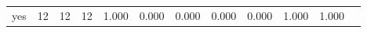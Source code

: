 \begin{longtable}{lp{1.00cm}p{1.00cm}p{1.00cm}p{1.00cm}p{1.00cm}p{1.00cm}p{1.00cm}p{1.00cm}p{1.00cm}p{1.00cm}p{1.00cm}}
yes       &                           12 &                 12 &                                12 &                                      1.000 &                                  0.000 &                                        0.000 &                             0.000 &                                   0.000 &                        1.000 &                                        1.000 \\
\end{longtable}
